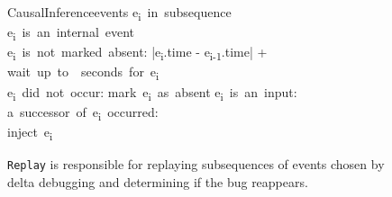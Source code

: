 \begin{figure}
  \begin{pseudocode}[framebox]{CausalInference}{events}
    \FOR e\textsubscript{i}\ in\ subsequence \\
    \BEGIN
    \IF e\textsubscript{i}\ is\ an\ internal\ event \\
    \AND e\textsubscript{i}\ is\ not\ marked\ absent:
    \THEN
    \BEGIN
      \Delta \GETS |e\textsubscript{i}.time - e\textsubscript{i-1}.time| + \epsilon \\
      wait\ up\ to\ \Delta\ seconds\ for\ e\textsubscript{i} \\
      \IF e\textsubscript{i}\ did\ not\ occur:
      \THEN mark\ e\textsubscript{i}\ as\ absent
    \END
    \ELSEIF e\textsubscript{i}\ is\ an\ input:
    \THEN
    \BEGIN
      \IF a\ successor\ of\ e\textsubscript{i}\ occurred: \\
      \THEN
      \ELSE
        inject\ e\textsubscript{i}
      \END
    \END
    \ENDPROCEDURE
  \end{pseudocode}
  \caption{{\tt Replay} is responsible for replaying subsequences of events
  chosen by delta debugging and determining
  if the bug reappears. }
    \label{fig:peek}
\end{figure}

%

